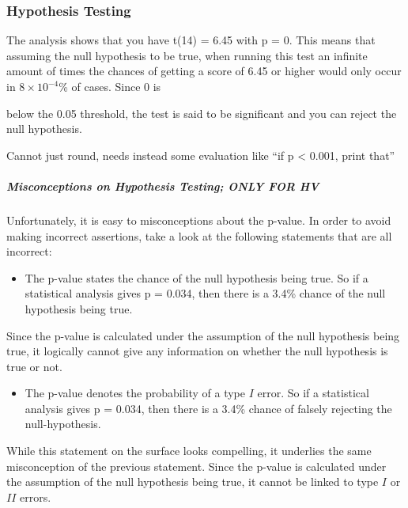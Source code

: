 \documentclass[
]{article}
\providecommand{\tightlist}{%
  \setlength{\itemsep}{0pt}\setlength{\parskip}{0pt}}
\begin{document}
\hypertarget{hypothesis-testing}{%
\subsubsection{Hypothesis Testing}\label{hypothesis-testing}}

The analysis shows that you have t(14) = 6.45 with p = 0. This means
that assuming the null hypothesis to be true, when running this test an
infinite amount of times the chances of getting a score of 6.45 or
higher would only occur in \ensuremath{8\times 10^{-4}}\% of cases.
Since 0 is

below the 0.05 threshold, the test is said to be significant and you can
reject the null hypothesis.

{Cannot just round, needs instead some evaluation like ``if p
\textless{} 0.001, print that''}

\hypertarget{misconceptions-on-hypothesis-testing-only-for-hv}{%
\subparagraph{Misconceptions on Hypothesis Testing; ONLY FOR
HV}\label{misconceptions-on-hypothesis-testing-only-for-hv}}

Unfortunately, it is easy to misconceptions about the p-value. In order
to avoid making incorrect assertions, take a look at the following
statements that are all incorrect:

\begin{itemize}
\tightlist
\item
  The p-value states the chance of the null hypothesis being true. So if
  a statistical analysis gives p = 0.034, then there is a 3.4\% chance
  of the null hypothesis being true.
\end{itemize}

Since the p-value is calculated under the assumption of the null
hypothesis being true, it logically cannot give any information on
whether the null hypothesis is true or not.

\begin{itemize}
\tightlist
\item
  The p-value denotes the probability of a type \(I\) error. So if a
  statistical analysis gives p = 0.034, then there is a 3.4\% chance of
  falsely rejecting the null-hypothesis.
\end{itemize}

While this statement on the surface looks compelling, it underlies the
same misconception of the previous statement. Since the p-value is
calculated under the assumption of the null hypothesis being true, it
cannot be linked to type \(I\) or \(II\) errors.
\end{document}
